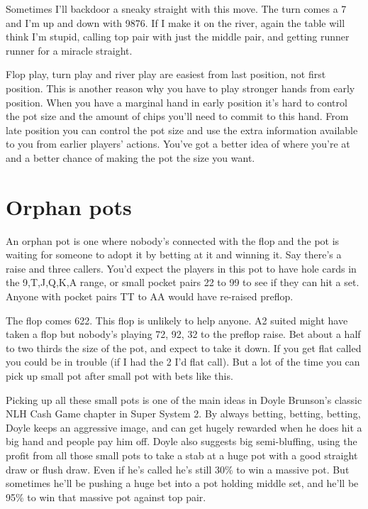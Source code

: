 Sometimes I'll backdoor a sneaky straight with this move. The turn comes
a 7 and I'm up and down with 9876. If I make it on the river,
again the table will think I'm stupid, calling top pair with just the
middle pair, and getting runner runner for a miracle straight.

Flop play, turn play and river play are easiest from last position, not
first position. This is another reason why you have to play stronger hands
from early position. When you have a marginal hand in early position
it's hard to control the pot size and the amount of chips
you'll need to commit to this hand. From late position you can control
the pot size and use the extra information available to you from
earlier players' actions. You've got a better idea of where you're at
and a better chance of making the pot the size you want.

\section{Orphan pots}

An orphan pot is one where nobody's connected with the flop and the
pot is waiting for someone to adopt it by betting at it and winning
it. Say there's a raise and three callers. You'd expect the players in
this pot to have hole cards in the 9,T,J,Q,K,A range, or small
pocket pairs 22 to 99 to see if they can hit a set. Anyone with pocket
pairs TT to AA would have re-raised preflop.

The flop comes 622. This flop is unlikely to help anyone.
A2 suited might have taken a flop but nobody's playing 72, 92, 32 to the
preflop raise. Bet about a half to two thirds the size of the pot,
and expect to take it down. If you get flat called you could
be in trouble (if I had the 2 I'd flat call).
But a lot of the time you can pick up small pot after small pot
with bets like this.

Picking up all these small pots is one of the main ideas in
Doyle Brunson's classic NLH Cash Game chapter in Super System 2.
By always betting, betting, betting, Doyle keeps an aggressive image,
and can get hugely rewarded when he does hit a big hand and people
pay him off. Doyle also suggests big semi-bluffing, using the
profit from all those small pots to take a stab at a huge pot
with a good straight draw or flush draw. Even if he's called
he's still 30\% to win a massive pot. But sometimes he'll be
pushing a huge bet into a pot holding middle set, and he'll be
95\% to win that massive pot against top pair.


